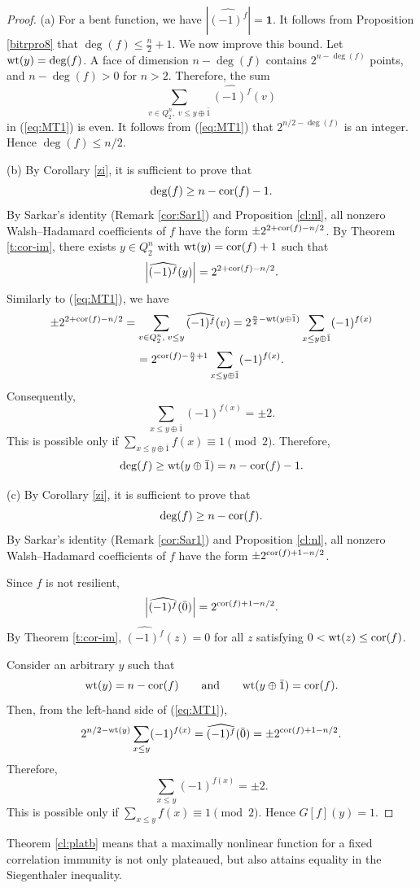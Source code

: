 \documentclass[11pt]{article}
\theoremstyle{definition}
\newcommand{\wt}{{\rm wt}}
\newcommand{\cor}{{\rm cor}}
\begin{document}
{{{\begin{proof}
(a) For a bent function, we have
$\left|\widehat{(-1)^f}\right|=\mathbf{1}$.
It follows from Proposition \ref{bitrpro8} that
$\deg(f)\leq\frac{n}{2}+1$.
We now improve this bound. Let $\wt(y)=\deg(f)$. A face of dimension
$n-\deg(f)$ contains
$2^{n-\deg(f)}$ points, and
$n-\deg(f)>0$ for $n>2$. Therefore, the sum
\[
\sum_{v\in Q_2^n,\;v\leq y\oplus\bar 1}
\widehat{(-1)^f}(v)
\]
in (\ref{eq:MT1}) is even. It follows from (\ref{eq:MT1}) that
$2^{n/2-\deg(f)}$
is an integer. Hence
$\deg(f)\leq n/2$.


(b) By Corollary \ref{zi}, it is sufficient to prove that
\[
\deg(f)\geq n-\cor(f)-1.
\]
By Sarkar's identity (Remark \ref{cor:Sar1}) and Proposition
\ref{cl:nl}, all nonzero Walsh--Hadamard coefficients of $f$ have
the form
$\pm2^{2+\cor(f)-n/2}$.
By Theorem \ref{t:cor-im}, there exists
$y\in Q_2^n$ with
$\wt(y)=\cor(f)+1$
such that
\[
\left|\widehat{(-1)^f}(y)\right|
=2^{2+\cor(f)-n/2}.
\]
Similarly to (\ref{eq:MT1}), we have
\[
\pm2^{2+\cor(f)-n/2}
=
\sum_{v\in Q_2^n,\;v\leq y}
\widehat{(-1)^f}(v)
=
2^{\frac n2-\wt(y\oplus\bar 1)}
\sum_{x\leq y\oplus\bar 1}(-1)^{f(x)}\]
\[=
2^{\cor(f)-\frac n2+1}
\sum_{x\leq y\oplus\bar 1}(-1)^{f(x)}.
\]
Consequently,
\[
\sum_{x\leq y\oplus\bar 1}(-1)^{f(x)}=\pm2.
\]
This is possible only if
$\sum_{x\leq y\oplus\bar 1}f(x)\equiv1\pmod2$.
Therefore,
$$
\deg(f)\geq\wt(y\oplus\bar 1)
=n-\cor(f)-1.$$


(c)
By Corollary \ref{zi}, it is sufficient to prove that
\[
\deg(f)\geq n-\cor(f).
\]
 By Sarkar's identity (Remark \ref{cor:Sar1}) and Proposition
\ref{cl:nl}, all nonzero Walsh--Hadamard coefficients of $f$ have
the form
$\pm2^{\cor(f)+1-n/2}$.

Since $f$ is not resilient,
\[
\left|\widehat{(-1)^f}(\bar0)\right|
=2^{\cor(f)+1-n/2}.
\]
By Theorem \ref{t:cor-im},
$\widehat{(-1)^f}(z)=0$
for all $z$ satisfying
$0<\wt(z)\leq\cor(f)$.


Consider an arbitrary $y$ such that
\[
\wt(y)=n-\cor(f)
\qquad\text{and}\qquad
\wt(y\oplus\bar1)=\cor(f).
\]
Then, from the left-hand side of (\ref{eq:MT1}),
\[
2^{n/2-\wt(y)}
\sum_{x\leq y}(-1)^{f(x)}
=
\widehat{(-1)^f}(\bar0)
=
\pm2^{\cor(f)+1-n/2}.
\]
Therefore,
\[
\sum_{x\leq y}(-1)^{f(x)}=\pm2.
\]
This is possible only if
$\sum_{x\leq y}f(x)\equiv1\pmod2$.
Hence
$
G[f](y)=1$.

\end{proof}

Theorem \ref{cl:platb} means that a maximally nonlinear function for a
fixed correlation immunity is not only plateaued, but also attains
equality in the Siegenthaler inequality.




}}}
\end{document}
